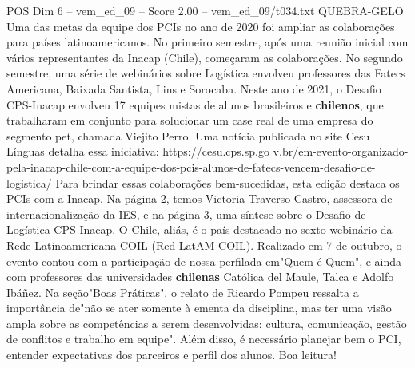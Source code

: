 \begin{textsample}{POS Dim 6 – vem\_ed\_09 – Score 2.00 – vem\_ed\_09/t034.txt}  \label{ex:f6_pos_134}
QUEBRA-GELO Uma das metas da equipe dos PCIs no ano de 2020 foi ampliar as colaborações para países latinoamericanos.
No primeiro semestre, após uma reunião inicial com vários representantes da Inacap (Chile), começaram as colaborações.
No segundo semestre, uma série de webinários sobre Logística envolveu professores das Fatecs Americana, Baixada Santista, Lins e Sorocaba.
Neste ano de 2021, o Desafio CPS-Inacap envolveu 17 equipes mistas de alunos brasileiros e \textbf{chilenos}, que trabalharam em conjunto para solucionar um case real de uma empresa do segmento pet, chamada Viejito Perro.
Uma notícia publicada no site Cesu Línguas detalha essa iniciativa: https://cesu.cps.sp.go v.br/em-evento-organizado-pela-inacap-chile-com-a-equipe-dos-pcis-alunos-de-fatecs-vencem-desafio-de-logistica/ Para brindar essas colaborações bem-sucedidas, esta edição destaca os PCIs com a Inacap.
Na página 2, temos Victoria Traverso Castro, assessora de internacionalização da IES, e na página 3, uma síntese sobre o Desafio de Logística CPS-Inacap.
O Chile, aliás, é o país destacado no sexto webinário da Rede Latinoamericana COIL (Red LatAM COIL).
Realizado em 7 de outubro, o evento contou com a participação de nossa perfilada em"Quem é Quem", e ainda com professores das universidades \textbf{chilenas} Católica del Maule, Talca e Adolfo Ibáñez.
Na seção"Boas Práticas", o relato de Ricardo Pompeu ressalta a importância de"não se ater somente à ementa da disciplina, mas ter uma visão ampla sobre as competências a serem desenvolvidas: cultura, comunicação, gestão de conflitos e trabalho em equipe".
Além disso, é necessário planejar bem o PCI, entender expectativas dos parceiros e perfil dos alunos.
Boa leitura!

\end{textsample}
